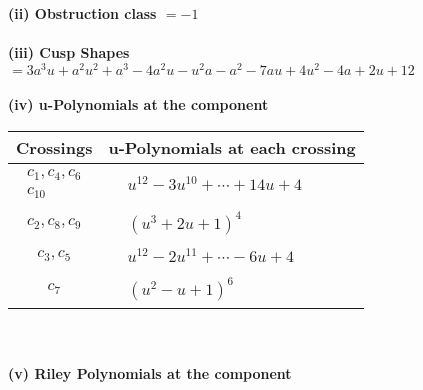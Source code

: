 \documentclass[1p]{elsarticle_modified}
\theoremstyle{definition}
\begin{document}
\flushleft \textbf{(ii) Obstruction class $= -1$}\\~\\
\flushleft \textbf{(iii) Cusp Shapes $= 3 a^3 u+a^2 u^2+a^3-4 a^2 u- u^2 a- a^2-7 a u+4 u^2-4 a+2 u+12$}\\~\\
\newpage\renewcommand{\arraystretch}{1}
\flushleft \textbf{(iv) u-Polynomials at the component}\newline \\
\begin{tabular}{m{50pt}|m{274pt}}
Crossings & \hspace{64pt}u-Polynomials at each crossing \\
\hline $$\begin{aligned}c_{1},c_{4},c_{6}\\c_{10}\end{aligned}$$&$\begin{aligned}
&u^{12}-3 u^{10}+\cdots+14 u+4
\end{aligned}$\\
\hline $$\begin{aligned}c_{2},c_{8},c_{9}\end{aligned}$$&$\begin{aligned}
&(u^3+2 u+1)^4
\end{aligned}$\\
\hline $$\begin{aligned}c_{3},c_{5}\end{aligned}$$&$\begin{aligned}
&u^{12}-2 u^{11}+\cdots-6 u+4
\end{aligned}$\\
\hline $$\begin{aligned}c_{7}\end{aligned}$$&$\begin{aligned}
&(u^2- u+1)^6
\end{aligned}$\\
\hline
\end{tabular}\\~\\
\newpage\renewcommand{\arraystretch}{1}
\flushleft \textbf{(v) Riley Polynomials at the component}\newline \\
\end{document}
